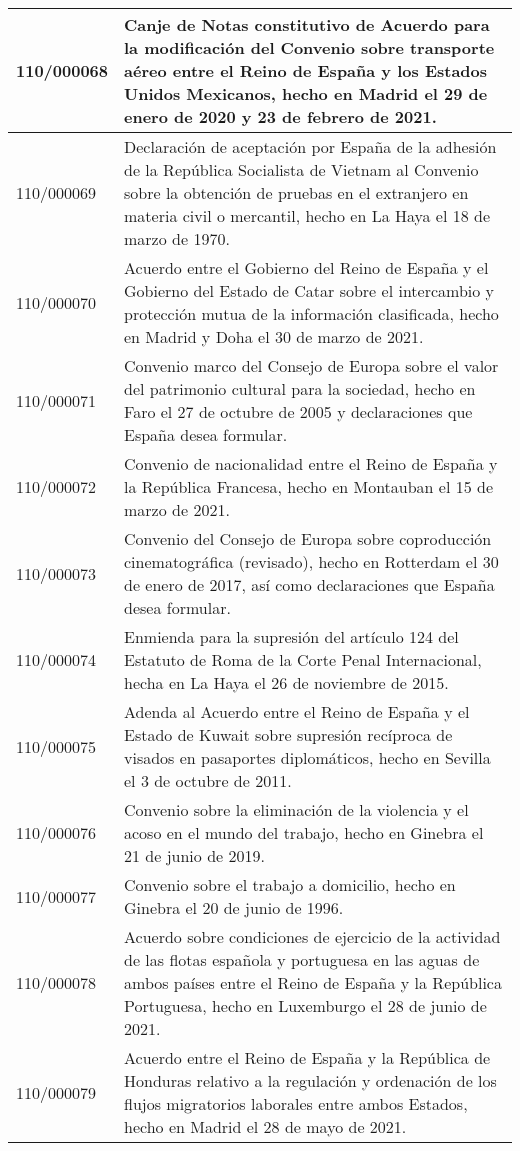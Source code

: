 {\begin{table}[H]
\begin{center}
\begin{tabularx}{\linewidth}{| l | X |}
\hline
110/000068 & Canje de Notas constitutivo de Acuerdo para la modificación del Convenio sobre transporte aéreo entre el Reino de España y los Estados Unidos Mexicanos, hecho en Madrid el 29 de enero de 2020 y 23 de febrero de 2021. \\
\hline
110/000069 & Declaración de aceptación por España de la adhesión de la República Socialista de Vietnam al Convenio sobre la obtención de pruebas en el extranjero en materia civil o mercantil, hecho en La Haya el 18 de marzo de 1970. \\
\hline
110/000070 & Acuerdo entre el Gobierno del Reino de España y el Gobierno del Estado de Catar sobre el intercambio y protección mutua de la información clasificada, hecho en Madrid y Doha el 30 de marzo de 2021. \\
\hline
110/000071 & Convenio marco del Consejo de Europa sobre el valor del patrimonio cultural para la sociedad, hecho en Faro el 27 de octubre de 2005 y declaraciones que España desea formular. \\
\hline
110/000072 & Convenio de nacionalidad entre el Reino de España y la República Francesa, hecho en Montauban el 15 de marzo de 2021. \\
\hline
110/000073 & Convenio del Consejo de Europa sobre coproducción cinematográfica (revisado), hecho en Rotterdam el 30 de enero de 2017, así como declaraciones que España desea formular. \\
\hline
110/000074 & Enmienda para la supresión del artículo 124 del Estatuto de Roma de la Corte Penal Internacional, hecha en La Haya el 26 de noviembre de 2015. \\
\hline
110/000075 & Adenda al Acuerdo entre el Reino de España y el Estado de Kuwait sobre supresión recíproca de visados en pasaportes diplomáticos, hecho en Sevilla el 3 de octubre de 2011. \\
\hline
110/000076 & Convenio sobre la eliminación de la violencia y el acoso en el mundo del trabajo, hecho en Ginebra el 21 de junio de 2019. \\
\hline
110/000077 & Convenio sobre el trabajo a domicilio, hecho en Ginebra el 20 de junio de 1996. \\
\hline
110/000078 & Acuerdo sobre condiciones de ejercicio de la actividad de las flotas española y portuguesa en las aguas de ambos países entre el Reino de España y la República Portuguesa, hecho en Luxemburgo el 28 de junio de 2021. \\
\hline
110/000079 & Acuerdo entre el Reino de España y la República de Honduras relativo a la regulación y ordenación de los flujos migratorios laborales entre ambos Estados, hecho en Madrid el 28 de mayo de 2021. \\

\end{tabularx}
\end{center}
\end{table}}
